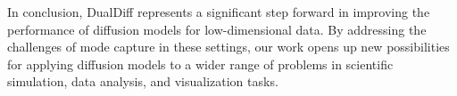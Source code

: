 \documentclass{article} %
\begin{document}
In conclusion, DualDiff represents a significant step forward in improving the performance of diffusion models for low-dimensional data. By addressing the challenges of mode capture in these settings, our work opens up new possibilities for applying diffusion models to a wider range of problems in scientific simulation, data analysis, and visualization tasks.



\end{document}
